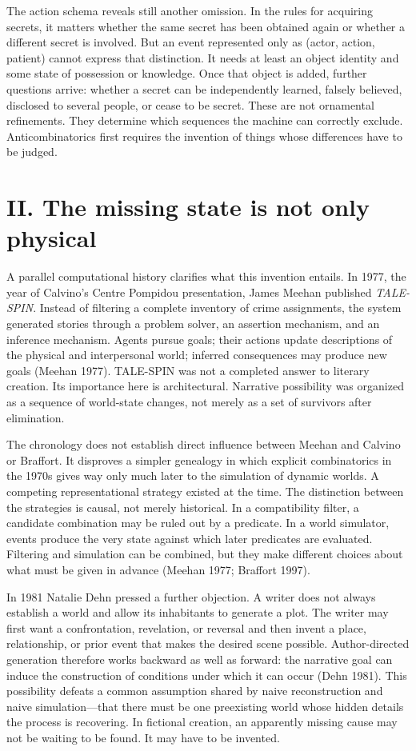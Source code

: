 \documentclass[
  11pt,
  letterpaper,
]{article}
\begin{document}
The action schema reveals still another omission. In the rules for
acquiring secrets, it matters whether the same secret has been obtained
again or whether a different secret is involved. But an event
represented only as (actor, action, patient) cannot express that
distinction. It needs at least an object identity and some state of
possession or knowledge. Once that object is added, further questions
arrive: whether a secret can be independently learned, falsely believed,
disclosed to several people, or cease to be secret. These are not
ornamental refinements. They determine which sequences the machine can
correctly exclude. Anticombinatorics first requires the invention of
things whose differences have to be judged.

\section{II. The missing state is not only
physical}\label{ii.-the-missing-state-is-not-only-physical}

A parallel computational history clarifies what this invention entails.
In 1977, the year of Calvino's Centre Pompidou presentation, James
Meehan published \emph{TALE-SPIN}. Instead of filtering a complete
inventory of crime assignments, the system generated stories through a
problem solver, an assertion mechanism, and an inference mechanism.
Agents pursue goals; their actions update descriptions of the physical
and interpersonal world; inferred consequences may produce new goals
(Meehan 1977). TALE-SPIN was not a completed answer to literary
creation. Its importance here is architectural. Narrative possibility
was organized as a sequence of world-state changes, not merely as a set
of survivors after elimination.

The chronology does not establish direct influence between Meehan and
Calvino or Braffort. It disproves a simpler genealogy in which explicit
combinatorics in the 1970s gives way only much later to the simulation
of dynamic worlds. A competing representational strategy existed at the
time. The distinction between the strategies is causal, not merely
historical. In a compatibility filter, a candidate combination may be
ruled out by a predicate. In a world simulator, events produce the very
state against which later predicates are evaluated. Filtering and
simulation can be combined, but they make different choices about what
must be given in advance (Meehan 1977; Braffort 1997).

In 1981 Natalie Dehn pressed a further objection. A writer does not
always establish a world and allow its inhabitants to generate a plot.
The writer may first want a confrontation, revelation, or reversal and
then invent a place, relationship, or prior event that makes the desired
scene possible. Author-directed generation therefore works backward as
well as forward: the narrative goal can induce the construction of
conditions under which it can occur (Dehn 1981). This possibility
defeats a common assumption shared by naive reconstruction and naive
simulation---that there must be one preexisting world whose hidden
details the process is recovering. In fictional creation, an apparently
missing cause may not be waiting to be found. It may have to be
invented.
\end{document}

